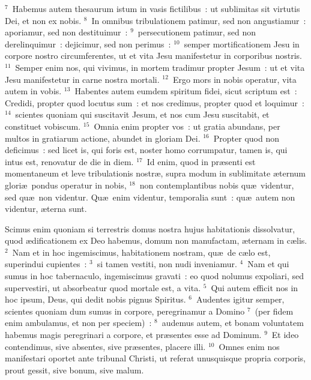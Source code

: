 ${}^{7}$~Habemus autem thesaurum istum in vasis fictilibus~: ut sublimitas sit virtutis Dei, et non ex nobis.
${}^{8}$~In omnibus tribulationem patimur, sed non angustiamur~: aporiamur, sed non destituimur~:
${}^{9}$~persecutionem patimur, sed non derelinquimur~: dejicimur, sed non perimus~:
${}^{10}$~semper mortificationem Jesu in corpore nostro circumferentes, ut et vita Jesu manifestetur in corporibus nostris.
${}^{11}$~Semper enim nos, qui vivimus, in mortem tradimur propter Jesum~: ut et vita Jesu manifestetur in carne nostra mortali.
${}^{12}$~Ergo mors in nobis operatur, vita autem in vobis.
${}^{13}$~Habentes autem eumdem spiritum fidei, sicut scriptum est~: Credidi, propter quod locutus sum~: et nos credimus, propter quod et loquimur~:
${}^{14}$~scientes quoniam qui suscitavit Jesum, et nos cum Jesu suscitabit, et constituet vobiscum.
${}^{15}$~Omnia enim propter vos~: ut gratia abundans, per multos in gratiarum actione, abundet in gloriam Dei.
${}^{16}$~Propter quod non deficimus~: sed licet is, qui foris est, noster homo corrumpatur, tamen is, qui intus est, renovatur de die in diem.
${}^{17}$~Id enim, quod in pr\ae senti est momentaneum et leve tribulationis nostr\ae , supra modum in sublimitate \ae ternum glori\ae\ pondus operatur in nobis,
${}^{18}$~non contemplantibus nobis qu\ae\ videntur, sed qu\ae\ non videntur. Qu\ae\ enim videntur, temporalia sunt~: qu\ae\ autem non videntur, \ae terna sunt.

\bchapter
\lettrine[lines=3,image=true,loversize=0.05,lraise=-0.03]{S}{}cimus enim quoniam si terrestris domus nostra hujus habitationis dissolvatur, quod \ae dificationem ex Deo habemus, domum non manufactam, \ae ternam in c\ae lis.
${}^{2}$~Nam et in hoc ingemiscimus, habitationem nostram, qu\ae\ de c\ae lo est, superindui cupientes~:
${}^{3}$~si tamen vestiti, non nudi inveniamur.
${}^{4}$~Nam et qui sumus in hoc tabernaculo, ingemiscimus gravati~: eo quod nolumus expoliari, sed supervestiri, ut absorbeatur quod mortale est, a vita.
${}^{5}$~Qui autem efficit nos in hoc ipsum, Deus, qui dedit nobis pignus Spiritus.
${}^{6}$~Audentes igitur semper, scientes quoniam dum sumus in corpore, peregrinamur a Domino
${}^{7}$~(per fidem enim ambulamus, et non per speciem)~:
${}^{8}$~audemus autem, et bonam voluntatem habemus magis peregrinari a corpore, et pr\ae sentes esse ad Dominum.
${}^{9}$~Et ideo contendimus, sive absentes, sive pr\ae sentes, placere illi.
${}^{10}$~Omnes enim nos manifestari oportet ante tribunal Christi, ut referat unusquisque propria corporis, prout gessit, sive bonum, sive malum.


